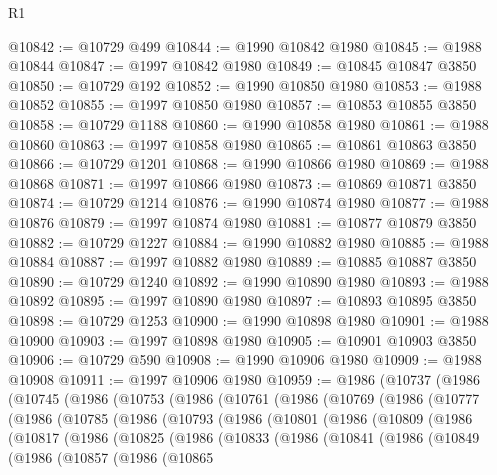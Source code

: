 \begin{lexlean}{R1}
\begin{coremodule}
@10842 := @10729 @499
@10844 := @1990 @10842 @1980
@10845 := @1988 @10844
@10847 := @1997 @10842 @1980
@10849 := @10845 @10847 @3850
@10850 := @10729 @192
@10852 := @1990 @10850 @1980
@10853 := @1988 @10852
@10855 := @1997 @10850 @1980
@10857 := @10853 @10855 @3850
@10858 := @10729 @1188
@10860 := @1990 @10858 @1980
@10861 := @1988 @10860
@10863 := @1997 @10858 @1980
@10865 := @10861 @10863 @3850
@10866 := @10729 @1201
@10868 := @1990 @10866 @1980
@10869 := @1988 @10868
@10871 := @1997 @10866 @1980
@10873 := @10869 @10871 @3850
@10874 := @10729 @1214
@10876 := @1990 @10874 @1980
@10877 := @1988 @10876
@10879 := @1997 @10874 @1980
@10881 := @10877 @10879 @3850
@10882 := @10729 @1227
@10884 := @1990 @10882 @1980
@10885 := @1988 @10884
@10887 := @1997 @10882 @1980
@10889 := @10885 @10887 @3850
@10890 := @10729 @1240
@10892 := @1990 @10890 @1980
@10893 := @1988 @10892
@10895 := @1997 @10890 @1980
@10897 := @10893 @10895 @3850
@10898 := @10729 @1253
@10900 := @1990 @10898 @1980
@10901 := @1988 @10900
@10903 := @1997 @10898 @1980
@10905 := @10901 @10903 @3850
@10906 := @10729 @590
@10908 := @1990 @10906 @1980
@10909 := @1988 @10908
@10911 := @1997 @10906 @1980
@10959 := @1986
    (@10737
      (@1986
        (@10745
          (@1986
            (@10753
              (@1986
                (@10761
                  (@1986
                    (@10769
                      (@1986
                        (@10777
                          (@1986
                            (@10785
                              (@1986
                                (@10793
                                  (@1986
                                    (@10801
                                      (@1986
                                        (@10809
                                          (@1986
                                            (@10817
                                              (@1986
                                                (@10825
                                                  (@1986
                                                    (@10833
                                                      (@1986
                                                        (@10841
                                                          (@1986
                                                            (@10849
                                                              (@1986
                                                                (@10857
                                                                  (@1986
                                                                    (@10865

\end{coremodule}
\end{lexlean}
